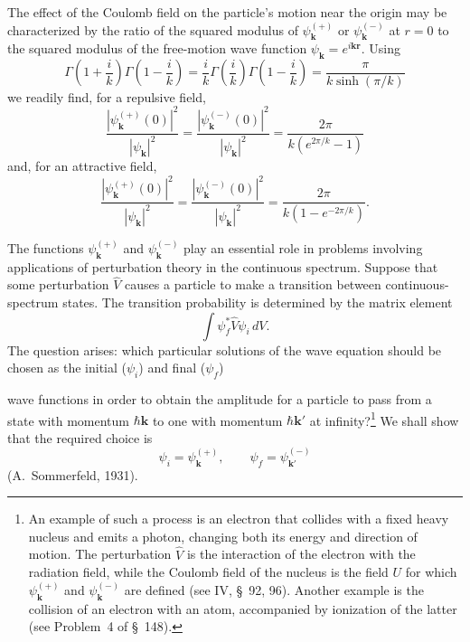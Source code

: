 The effect of the Coulomb field on the particle's motion near the origin may be characterized by the ratio of the squared modulus of $\psi_{\mathbf k}^{(+)}$ or $\psi_{\mathbf k}^{(-)}$ at $r=0$ to the squared modulus of the free-motion wave function $\psi_{\mathbf k}=e^{i\mathbf{kr}}$. Using
\[
 \Gamma\left(1+\frac{i}{k}\right)\Gamma\left(1-\frac{i}{k}\right)
 =\frac{i}{k}\Gamma\left(\frac{i}{k}\right)\Gamma\left(1-\frac{i}{k}\right)
 =\frac{\pi}{k\sinh(\pi/k)}
\]
we readily find, for a repulsive field,
\begin{equation}
 \frac{|\psi_{\mathbf k}^{(+)}(0)|^2}{|\psi_{\mathbf k}|^2}
 =\frac{|\psi_{\mathbf k}^{(-)}(0)|^2}{|\psi_{\mathbf k}|^2}
 =\frac{2\pi}{k(e^{2\pi/k}-1)}
 \tag{136.10}
\end{equation}
and, for an attractive field,
\begin{equation}
 \frac{|\psi_{\mathbf k}^{(+)}(0)|^2}{|\psi_{\mathbf k}|^2}
 =\frac{|\psi_{\mathbf k}^{(-)}(0)|^2}{|\psi_{\mathbf k}|^2}
 =\frac{2\pi}{k(1-e^{-2\pi/k})}.
 \tag{136.11}
\end{equation}

The functions $\psi_{\mathbf k}^{(+)}$ and $\psi_{\mathbf k}^{(-)}$ play an essential role in problems involving applications of perturbation theory in the continuous spectrum. Suppose that some perturbation $\hat V$ causes a particle to make a transition between continuous-spectrum states. The transition probability is determined by the matrix element
\begin{equation}
 \int\psi_f^*\hat V\psi_i\,dV.
 \tag{136.12}
\end{equation}
The question arises: which particular solutions of the wave equation should be chosen as the initial ($\psi_i$) and final ($\psi_f$)

wave functions in order to obtain the amplitude for a particle to pass from a state with momentum $\hbar\mathbf k$ to one with momentum $\hbar\mathbf k'$ at infinity?\footnote{An example of such a process is an electron that collides with a fixed heavy nucleus and emits a photon, changing both its energy and direction of motion. The perturbation $\hat V$ is the interaction of the electron with the radiation field, while the Coulomb field of the nucleus is the field $U$ for which $\psi_{\mathbf k}^{(+)}$ and $\psi_{\mathbf k}^{(-)}$ are defined (see IV, \S~92, 96). Another example is the collision of an electron with an atom, accompanied by ionization of the latter (see Problem~4 of \S~148).} We shall show that the required choice is
\begin{equation}
 \psi_i=\psi_{\mathbf k}^{(+)},\qquad\psi_f=\psi_{\mathbf k'}^{(-)}
 \tag{136.13}
\end{equation}
(A.~Sommerfeld, 1931).

